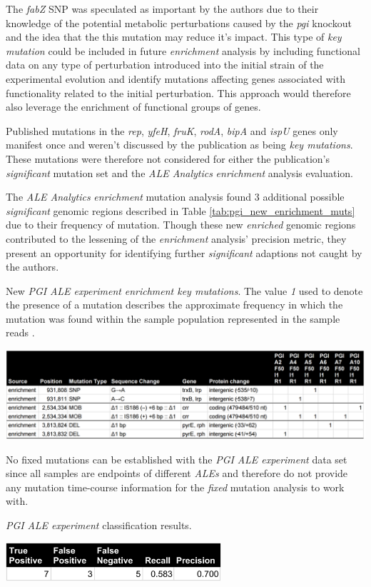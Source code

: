 \documentclass[12pt,final,masters,chapterheads]{ucsd}  %
\begin{document}
The \textit{fabZ} SNP was speculated as important by the authors due to their knowledge of the potential metabolic perturbations caused by the \textit{pgi} knockout and the idea that the this mutation may reduce it's impact. This type of \textit{key mutation} could be included in future \textit{enrichment} analysis by including functional data on any type of perturbation introduced into the initial strain of the experimental evolution and identify mutations affecting genes associated with functionality related to the initial perturbation. This approach would therefore also leverage the enrichment of functional groups of genes.

Published mutations in the \textit{rep}, \textit{yfeH}, \textit{fruK}, \textit{rodA}, \textit{bipA} and \textit{ispU} genes only manifest once and weren't discussed by the publication as being \textit{key mutations}. These mutations were therefore not considered for either the publication's \textit{significant} mutation set and the \textit{ALE Analytics} \textit{enrichment} analysis evaluation.

The \textit{ALE Analytics} \textit{enrichment} mutation analysis found 3 additional possible \textit{significant} genomic regions described in Table \ref{tab:pgi_new_enrichment_muts} due to their frequency of mutation. Though these new \textit{enriched} genomic regions contributed to the lessening of the \textit{enrichment} analysis' precision metric, they present an opportunity for identifying further \textit{significant} adaptions not caught by the authors.
\begin{table}[H]
  \caption{New \textit{PGI} \textit{ALE experiment} \textit{enrichment key mutations}. The value \textit{1} used to denote the presence of a mutation describes the approximate frequency in which the mutation was found within the sample population represented in the sample reads \cite{breseq_paper}.}
  \centering
  \includegraphics[width=\textwidth]{pgi_new_enrichment_muts.png}
  \label{tab:pgi_new_enrichment_muts}
\end{table}
No fixed mutations can be established with the \textit{PGI} \textit{ALE experiment} data set since all samples are endpoints of different \textit{ALEs} and therefore do not provide any mutation time-course information for the \textit{fixed} mutation analysis to work with.
\begin{table}[H]
  \centering
  \caption{\textit{PGI} \textit{ALE experiment} classification results.}
  \includegraphics[width=0.6\textwidth]{pgi_precision_recall.png}
\end{table}
\end{document}
